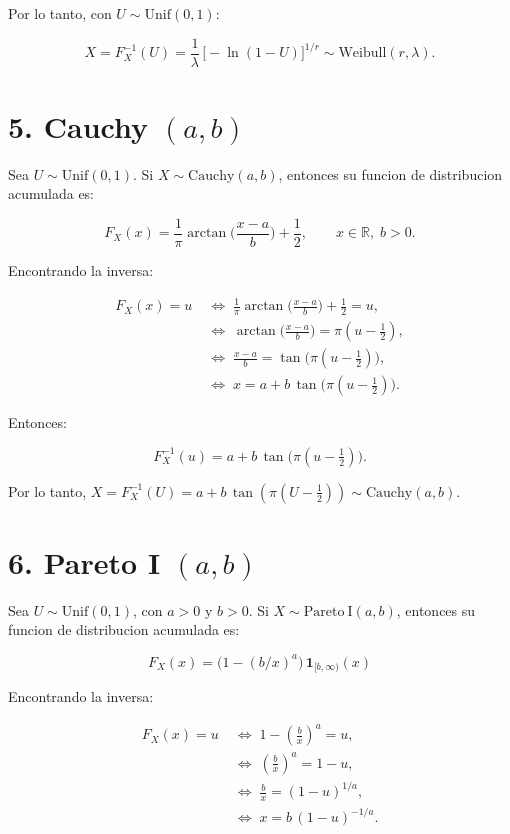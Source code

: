 \documentclass[10pt,a4paper]{article}
\begin{document}
Por lo tanto, con \(U\sim\mathrm{Unif}(0,1)\):

\[
X=F_X^{-1}(U)=\frac{1}{\lambda}\,\bigl[-\ln(1-U)\bigr]^{1/r}\sim\mathrm{Weibull}(r,\lambda).
\]

    \hypertarget{cauchy-ab}{%
\section{\texorpdfstring{5. Cauchy
\((a,b)\)}{5. Cauchy (a,b)}}\label{cauchy-ab}}

    Sea \textbf{\(U\sim\mathrm{Unif}(0,1)\)}. Si
\(X\sim\mathrm{Cauchy}(a,b)\), entonces su funcion de distribucion
acumulada es:

\[
F_X(x)=\frac{1}{\pi}\arctan\!\Big(\frac{x-a}{b}\Big)+\frac{1}{2},\qquad x\in\mathbb{R},\; b>0.
\]

Encontrando la inversa:

\[
\begin{aligned}
F_X(x)=u 
&\;\iff\; \frac{1}{\pi}\arctan\!\Big(\frac{x-a}{b}\Big)+\frac{1}{2}=u,\\
&\;\iff\; \arctan\!\Big(\frac{x-a}{b}\Big)=\pi\!\left(u-\tfrac{1}{2}\right),\\
&\;\iff\; \frac{x-a}{b}=\tan\!\big(\pi(u-\tfrac{1}{2})\big),\\
&\;\iff\; x=a+b\,\tan\!\big(\pi(u-\tfrac{1}{2})\big).
\end{aligned}
\]

Entonces:

\[
F_X^{-1}(u)=a+b\,\tan\!\big(\pi(u-\tfrac{1}{2})\big).
\]

Por lo tanto,
\(X=F_X^{-1}(U)=a+b\,\tan(\pi(U-\tfrac{1}{2}))\sim\mathrm{Cauchy}(a,b)\).

    \hypertarget{pareto-i-ab}{%
\section{\texorpdfstring{6. Pareto I
\((a,b)\)}{6. Pareto I (a,b)}}\label{pareto-i-ab}}

    Sea \textbf{\(U\sim\mathrm{Unif}(0,1)\)}, con \(a>0\) y \(b>0\). Si
\(X\sim\mathrm{Pareto\ I}(a,b)\), entonces su funcion de distribucion
acumulada es:

\[
F_X(x)=\bigl(1-(b/x)^a\bigr)\,\mathbf{1}_{[b,\infty)}(x)
\]

Encontrando la inversa:

\[
\begin{aligned}
F_X(x)=u &\;\iff\; 1-\left(\frac{b}{x}\right)^a=u,\\
         &\;\iff\; \left(\frac{b}{x}\right)^a=1-u,\\
         &\;\iff\; \frac{b}{x}=(1-u)^{1/a},\\
         &\;\iff\; x=b\,(1-u)^{-1/a}.
\end{aligned}
\]
\end{document}

